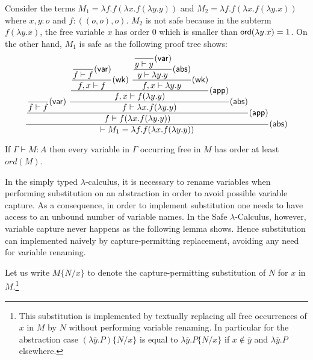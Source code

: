 \documentclass{llncs}
\newcommand\captsubst[2]{\{#1/#2 \}}
\newcommand\dps{\displaystyle}
\newcommand\rulef[2]{\frac{\dps #1}{#2}}
\newcommand\ord[1]{{\sf ord}(#1)}
\begin{document}
\begin{example}
\label{ex:kierstead}
Consider the terms $M_1 = \lambda f . f (\lambda x . f (\lambda y . y ))$ and
$M_2 = \lambda f . f (\lambda x . f (\lambda y .x ))$ where $x,y:o$ and $f:((o,o),o)$.
$M_2$ is not safe because in the subterm $f (\lambda y . x)$, the free variable $x$ has order $0$ which is smaller than $\ord{\lambda y . x} = 1$.
On the other hand, $M_1$ is safe as the following proof tree shows:
$$
 \rulef{
     \rulef{
        \rulef{}{f \vdash f} {\sf(var)}
        \
        \rulef{
             \rulef{
                \rulef{
                    \rulef{}{f \vdash f} {\sf(var)}
                }
                {f , x \vdash f } {\sf(wk)}
                \
                \rulef{
                    \rulef{
                        \rulef{}{y \vdash y} {\sf(var)}
                    }
                    {y \vdash \lambda y . y } {\sf(abs)}
                }
                {f , x \vdash \lambda y .y } {\sf(wk)}
             }
             {f , x \vdash f (\lambda y .y )} {\sf(app)}
        }
        { f  \vdash \lambda x . f (\lambda y .y )} {\sf(abs)}
     }
     {
        f  \vdash f (\lambda x . f (\lambda y .y ))} {\sf(app)}
     }
 { \vdash M_1 = \lambda f . f (\lambda x . f (\lambda y .y )) } {\sf(abs)}
$$
\end{example}

\begin{lemma}
\label{lem:ordfreevar}
If $\Gamma \vdash M : A$ then every variable in $\Gamma$ occurring free in $M$ has order at least $ord(M)$.
\end{lemma}




In the simply typed $\lambda$-calculus, it is necessary to rename
variables when performing substitution on an abstraction in order to
avoid possible variable capture. As a consequence, in order to
implement substitution one needs to have access to an unbound number
of variable names.
In the Safe $\lambda$-Calculus, however, variable capture never happens as the following lemma shows.
Hence substitution can implemented naively by capture-permitting replacement, avoiding any need for variable renaming.


Let us write $M\captsubst{N}{x}$ to denote the capture-permitting substitution of $N$ for $x$ in $M$.\footnote{This substitution is implemented
by textually replacing all free occurrences of $x$ in $M$ by $N$ without performing variable renaming.
In particular for the abstraction case 
$(\lambda \overline{y} . P)\captsubst{N}{x}$ is 
equal to $\lambda \overline{y} . P\captsubst{N}{x}$ if $x\not\in \overline{y}$ and $\lambda \overline{y} . P$ elsewhere.}
\end{document}
